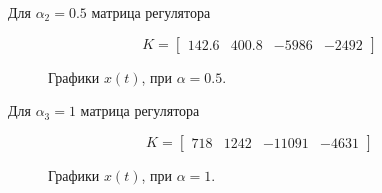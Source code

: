 Для $\alpha_2=0.5$ матрица регулятора

\begin{equation}
    K = \begin{bmatrix}
        142.6 & 400.8 & -5986 & -2492
    \end{bmatrix}
\end{equation}

\begin{figure}[!h]
\caption{Графики $x(t)$, при $\alpha = 0.5$.}
\label{4_3_2}
\end{figure}


Для $\alpha_3=1$ матрица регулятора

\begin{equation}
    K = \begin{bmatrix}
        718& 1242 & -11091 & -4631
    \end{bmatrix}
\end{equation}

\begin{figure}[!h]
\caption{Графики $x(t)$, при $\alpha = 1$.}
\label{4_3_3}
\end{figure}

